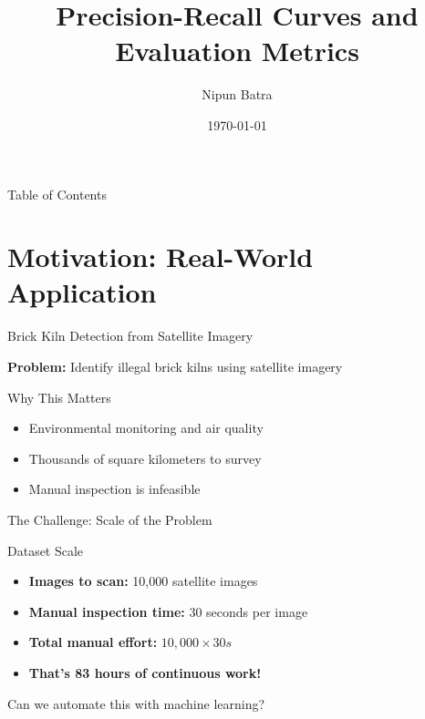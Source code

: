 \documentclass{beamer}
\title{Precision-Recall Curves and Evaluation Metrics}
\date{\today}
\author{Nipun Batra}
\institute{IIT Gandhinagar}
\begin{document}
\maketitle

\begin{frame}{Table of Contents}
\tableofcontents
\end{frame}

\section{Motivation: Real-World Application}

\begin{frame}{Brick Kiln Detection from Satellite Imagery}
\begin{center}
\textbf{Problem:} Identify illegal brick kilns using satellite imagery
\end{center}

\vspace{0.15cm}

\begin{keypointsbox}{Why This Matters}
\small
\begin{itemize}
    \item Environmental monitoring and air quality
    \item Thousands of square kilometers to survey
    \item Manual inspection is infeasible
\end{itemize}
\end{keypointsbox}
\end{frame}

\begin{frame}{The Challenge: Scale of the Problem}
\begin{block}{Dataset Scale}
\begin{itemize}
    \item \textbf{Images to scan:} 10,000 satellite images
    \item \textbf{Manual inspection time:} 30 seconds per image
    \item \textbf{Total manual effort:} $10{,}000 \times 30s$
    \item \textbf{That's 83 hours of continuous work!}
\end{itemize}
\end{block}

\vspace{0.2cm}

\begin{center}
\Large
Can we automate this with machine learning?
\end{center}
\end{frame}
\end{document}

